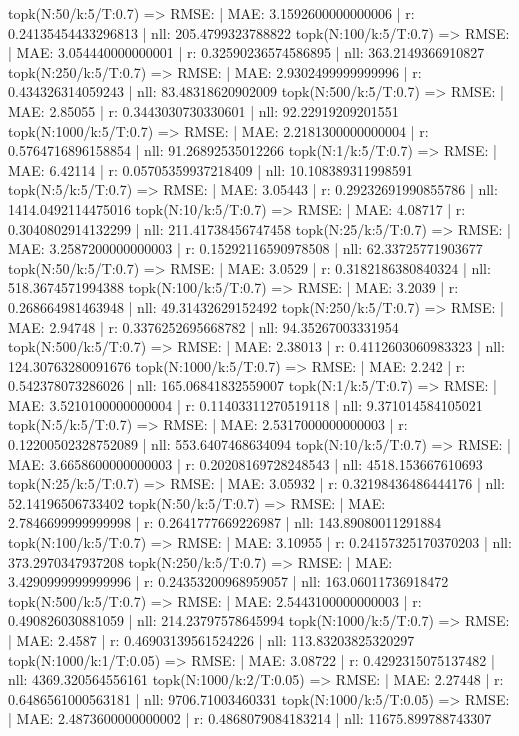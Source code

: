 topk(N:50/k:5/T:0.7) => RMSE: | MAE: 3.1592600000000006 | r: 0.24135454433296813 | nll: 205.4799323788822
topk(N:100/k:5/T:0.7) => RMSE: | MAE: 3.054440000000001 | r: 0.32590236574586895 | nll: 363.2149366910827
topk(N:250/k:5/T:0.7) => RMSE: | MAE: 2.9302499999999996 | r: 0.434326314059243 | nll: 83.48318620902009
topk(N:500/k:5/T:0.7) => RMSE: | MAE: 2.85055 | r: 0.3443030730330601 | nll: 92.22919209201551
topk(N:1000/k:5/T:0.7) => RMSE: | MAE: 2.2181300000000004 | r: 0.5764716896158854 | nll: 91.26892535012266
topk(N:1/k:5/T:0.7) => RMSE: | MAE: 6.42114 | r: 0.05705359937218409 | nll: 10.108389311998591
topk(N:5/k:5/T:0.7) => RMSE: | MAE: 3.05443 | r: 0.29232691990855786 | nll: 1414.0492114475016
topk(N:10/k:5/T:0.7) => RMSE: | MAE: 4.08717 | r: 0.3040802914132299 | nll: 211.41738456747458
topk(N:25/k:5/T:0.7) => RMSE: | MAE: 3.2587200000000003 | r: 0.15292116590978508 | nll: 62.33725771903677
topk(N:50/k:5/T:0.7) => RMSE: | MAE: 3.0529 | r: 0.3182186380840324 | nll: 518.3674571994388
topk(N:100/k:5/T:0.7) => RMSE: | MAE: 3.2039 | r: 0.268664981463948 | nll: 49.31432629152492
topk(N:250/k:5/T:0.7) => RMSE: | MAE: 2.94748 | r: 0.3376252695668782 | nll: 94.35267003331954
topk(N:500/k:5/T:0.7) => RMSE: | MAE: 2.38013 | r: 0.4112603060983323 | nll: 124.30763280091676
topk(N:1000/k:5/T:0.7) => RMSE: | MAE: 2.242 | r: 0.542378073286026 | nll: 165.06841832559007
topk(N:1/k:5/T:0.7) => RMSE: | MAE: 3.5210100000000004 | r: 0.11403311270519118 | nll: 9.371014584105021
topk(N:5/k:5/T:0.7) => RMSE: | MAE: 2.5317000000000003 | r: 0.12200502328752089 | nll: 553.6407468634094
topk(N:10/k:5/T:0.7) => RMSE: | MAE: 3.6658600000000003 | r: 0.20208169728248543 | nll: 4518.153667610693
topk(N:25/k:5/T:0.7) => RMSE: | MAE: 3.05932 | r: 0.32198436486444176 | nll: 52.14196506733402
topk(N:50/k:5/T:0.7) => RMSE: | MAE: 2.7846699999999998 | r: 0.2641777669226987 | nll: 143.89080011291884
topk(N:100/k:5/T:0.7) => RMSE: | MAE: 3.10955 | r: 0.24157325170370203 | nll: 373.2970347937208
topk(N:250/k:5/T:0.7) => RMSE: | MAE: 3.4290999999999996 | r: 0.24353200968959057 | nll: 163.06011736918472
topk(N:500/k:5/T:0.7) => RMSE: | MAE: 2.5443100000000003 | r: 0.490826030881059 | nll: 214.23797578645994
topk(N:1000/k:5/T:0.7) => RMSE: | MAE: 2.4587 | r: 0.46903139561524226 | nll: 113.83203825320297
topk(N:1000/k:1/T:0.05) => RMSE: | MAE: 3.08722 | r: 0.4292315075137482 | nll: 4369.320564556161
topk(N:1000/k:2/T:0.05) => RMSE: | MAE: 2.27448 | r: 0.6486561000563181 | nll: 9706.71003460331
topk(N:1000/k:5/T:0.05) => RMSE: | MAE: 2.4873600000000002 | r: 0.4868079084183214 | nll: 11675.899788743307
